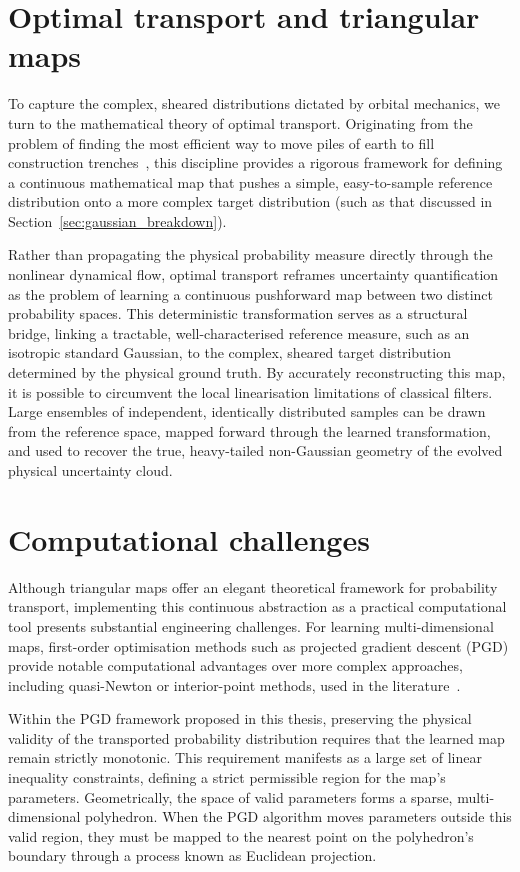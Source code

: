 \section{Optimal transport and triangular maps}

To capture the complex, sheared distributions dictated by orbital mechanics, we turn to the mathematical theory of optimal transport. Originating from the problem of finding the most efficient way to move piles of earth to fill construction trenches~\cite{monge1781memoire}, this discipline provides a rigorous framework for defining a continuous mathematical map that pushes a simple, easy-to-sample reference distribution onto a more complex target distribution (such as that discussed in Section~\ref{sec:gaussian_breakdown}).

Rather than propagating the physical probability measure directly through the nonlinear dynamical flow, optimal transport reframes uncertainty quantification as the problem of learning a continuous pushforward map between two distinct probability spaces. This deterministic transformation serves as a structural bridge, linking a tractable, well-characterised reference measure, such as an isotropic standard Gaussian, to the complex, sheared target distribution determined by the physical ground truth. By accurately reconstructing this map, it is possible to circumvent the local linearisation limitations of classical filters. Large ensembles of independent, identically distributed samples can be drawn from the reference space, mapped forward through the learned transformation, and used to recover the true, heavy-tailed non-Gaussian geometry of the evolved physical uncertainty cloud.

\section{Computational challenges}

Although triangular maps offer an elegant theoretical framework for probability transport, implementing this continuous abstraction as a practical computational tool presents substantial engineering challenges. For learning multi-dimensional maps, first-order optimisation methods such as projected gradient descent (PGD) provide notable computational advantages over more complex approaches, including quasi-Newton or interior-point methods, used in the literature~\cite{Baptista2022}.

Within the PGD framework proposed in this thesis, preserving the physical validity of the transported probability distribution requires that the learned map remain strictly monotonic. This requirement manifests as a large set of linear inequality constraints, defining a strict permissible region for the map's parameters. Geometrically, the space of valid parameters forms a sparse, multi-dimensional polyhedron. When the PGD algorithm moves parameters outside this valid region, they must be mapped to the nearest point on the polyhedron's boundary through a process known as Euclidean projection.

